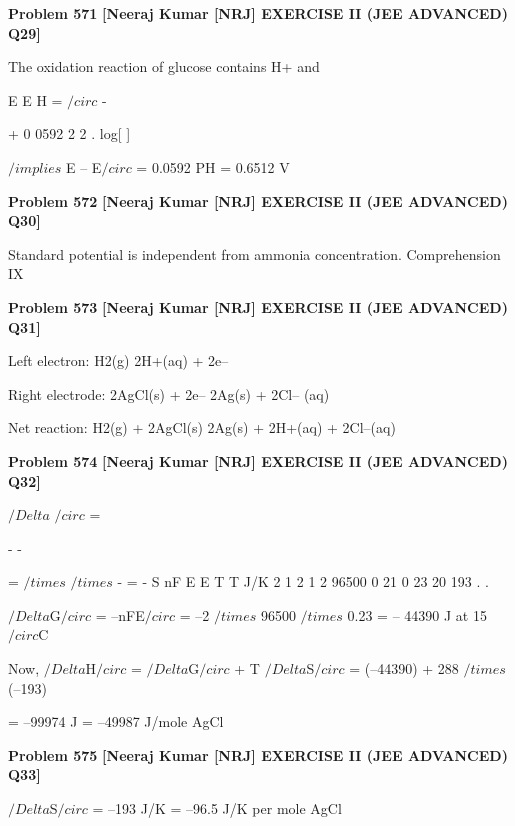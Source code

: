 \begin{problembox}
\textbf{Problem 571} \hfill \textbf{[Neeraj Kumar [NRJ] EXERCISE II (JEE ADVANCED) Q29]}
\label{q:ext-nrj_all_questions-571}

The oxidation reaction of glucose contains H+ 
and
 
 
E
E
H
=
$/circ$ -
 
+
0 0592
2
2
.
log[
] 
 
 $/implies$ E -- E$/circ$ = 0.0592 PH = 0.6512 V
\end{problembox}

\begin{problembox}
\textbf{Problem 572} \hfill \textbf{[Neeraj Kumar [NRJ] EXERCISE II (JEE ADVANCED) Q30]}
\label{q:ext-nrj_all_questions-572}

Standard potential is independent from ammonia 
concentration.
Comprehension IX
\end{problembox}

\begin{problembox}
\textbf{Problem 573} \hfill \textbf{[Neeraj Kumar [NRJ] EXERCISE II (JEE ADVANCED) Q31]}
\label{q:ext-nrj_all_questions-573}

Left electron: H2(g) 
 2H+(aq) + 2e--
 
 Right electrode: 2AgCl(s) + 2e-- 
 2Ag(s) + 
2Cl-- (aq)
 
    Net reaction: H2(g) + 2AgCl(s) 
 2Ag(s) 
+ 2H+(aq) + 2Cl--(aq)
\end{problembox}

\begin{problembox}
\textbf{Problem 574} \hfill \textbf{[Neeraj Kumar [NRJ] EXERCISE II (JEE ADVANCED) Q32]}
\label{q:ext-nrj_all_questions-574}

$/Delta$ $/circ$ =
 
-
-
 
  
 
  =
$/times$
$/times$
-
= -
S
nF
E
E
T
T
J/K
2
1
2
1
2
96500
0 21
0 23
20
193
.
.
 
 $/Delta$G$/circ$ = --nFE$/circ$ = --2 $/times$ 96500 $/times$ 0.23 = -- 44390 J at 
15$/circ$C
 
 Now, $/Delta$H$/circ$ = $/Delta$G$/circ$ + T   $/Delta$S$/circ$ = (--44390) + 288 $/times$ 
(--193)
 
 = --99974 J = --49987 J/mole AgCl
\end{problembox}

\begin{problembox}
\textbf{Problem 575} \hfill \textbf{[Neeraj Kumar [NRJ] EXERCISE II (JEE ADVANCED) Q33]}
\label{q:ext-nrj_all_questions-575}

$/Delta$S$/circ$ = --193 J/K = --96.5 J/K per mole AgCl
\end{problembox}

